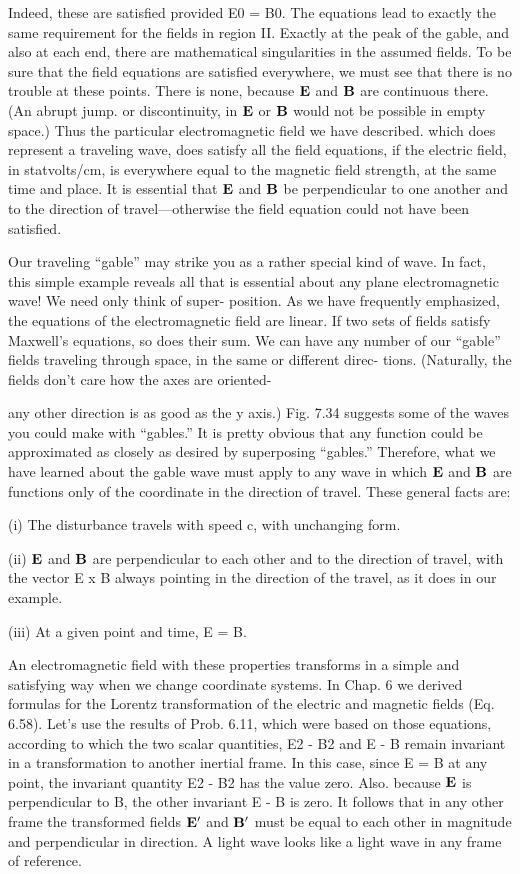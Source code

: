 Indeed, these are satisfied provided E0 = B0. The equations lead
to exactly the same requirement for the fields in region II. Exactly
at the peak of the gable, and also at each end, there are mathematical
singularities in the assumed fields. To be sure that the field equations
are satisfied everywhere, we must see that there is no trouble at these
points. There is none, because $\mathbf{E}$ and $\mathbf{B}$ are continuous there. (An
abrupt jump. or discontinuity, in $\mathbf{E}$ or $\mathbf{B}$ would not be possible in
empty space.) Thus the particular electromagnetic field we have
described. which does represent a traveling wave, does satisfy all the
field equations, if the electric field, in statvolts/cm, is everywhere
equal to the magnetic field strength, at the same time and place. It is
essential that $\mathbf{E}$ and $\mathbf{B}$ be perpendicular to one another and to the
direction of travel---otherwise the field equation could not have been
satisfied.

Our traveling ``gable'' may strike you as a rather special kind of
wave. In fact, this simple example reveals all that is essential about
any plane electromagnetic wave! We need only think of super-
position. As we have frequently emphasized, the equations of the
electromagnetic field are linear. If two sets of fields satisfy Maxwell's
equations, so does their sum. We can have any number of our
``gable'' fields traveling through space, in the same or different direc-
tions. (Naturally, the fields don't care how the axes are oriented-

any other direction is as good as the y axis.) Fig. 7.34 suggests some
of the waves you could make with ``gables.'' It is pretty obvious that
any function could be approximated as closely as desired by superposing
``gables.'' Therefore, what we have learned about the gable
wave must apply to any wave in which $\mathbf{E}$ and $\mathbf{B}$ are functions only
of the coordinate in the direction of travel. These general facts are:

(i) The disturbance travels with speed c, with unchanging
form. 

(ii) $\mathbf{E}$ and $\mathbf{B}$ are perpendicular to each other and to the direction
of travel, with the vector E x B always pointing in the
direction of the travel, as it does in our example.

(iii) At a given point and time, E = B.

An electromagnetic field with these properties transforms in a
simple and satisfying way when we change coordinate systems. In
Chap. 6 we derived formulas for the Lorentz transformation of the
electric and magnetic fields (Eq. 6.58). Let's use the results of
Prob. 6.11, which were based on those equations, according to which
the two scalar quantities, E2 - B2 and E - B remain invariant in a
transformation to another inertial frame. In this case, since E = B
at any point, the invariant quantity E2 - B2 has the value zero. Also.
because $\mathbf{E}$ is perpendicular to B, the other invariant E - B is zero. It
follows that in any other frame the transformed fields $\mathbf{E}'$ and $\mathbf{B}'$ must
be equal to each other in magnitude and perpendicular in direction.
A light wave looks like a light wave in any frame of reference.

\fi
